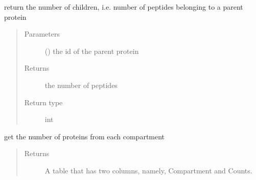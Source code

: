 \documentclass[letterpaper,10pt,english]{sphinxmanual}
\begin{document}
\begin{fulllineitems}
\begin{fulllineitems}
\begin{quote}
\begin{description}
\end{description}\end{quote}

\end{fulllineitems}


\begin{fulllineitems}
\label{\detokenize{IPTK.Classes:IPTK.Classes.Experiment.Experiment.get_number_of_children}}
return the number of children, i.e. number of peptides belonging to a parent protein
\begin{quote}\begin{description}
\item[{Parameters}] \leavevmode
{} () \textendash{} the id of the parent protein

\item[{Returns}] \leavevmode
the number of peptides

\item[{Return type}] \leavevmode
int

\end{description}\end{quote}

\end{fulllineitems}


\begin{fulllineitems}
\label{\detokenize{IPTK.Classes:IPTK.Classes.Experiment.Experiment.get_number_of_proteins_per_compartment}}
get the number of proteins from each compartment
\begin{quote}\begin{description}
\item[{Returns}] \leavevmode
A table that has two columns, namely, Compartment and Counts.


\end{description}
\end{quote}
\end{fulllineitems}
\end{fulllineitems}
\end{document}
